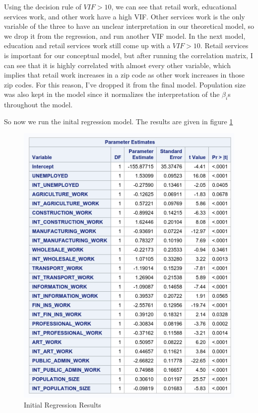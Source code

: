 Using the decision rule of $VIF>10$, we can see that retail work, educational services work, and other work have a high VIF. Other services work is the only variable of the three to have an unclear interpretation in our theoretical model, so we drop it from the regression, and run another VIF model. In the next model, education and retail services work still come up with a $VIF > 10$. Retail services is important for our conceptual model, but after running the correlation matrix, I can see that it is highly correlated with almost every other variable, which implies that retail work increases in a zip code as other work increases in those zip codes. For this reason, I've dropped it from the final model. Population size was also kept in the model since it normalizes the interpretation of the $\beta_i$s throughout the model. 

So now we run the inital regression model. The results are given in figure \ref{fig:reg}

\begin{figure}
\centering
\includegraphics{Chapters/reg.png}
\caption{Initial Regression Results}
\label{fig:reg}
\end{figure}

